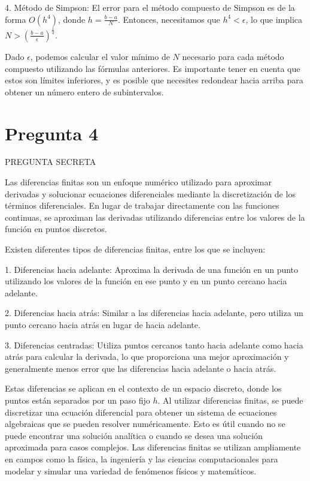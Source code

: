 \documentclass[a4paper,12pt]{article}
\begin{document}
4. Método de Simpson:
   El error para el método compuesto de Simpson es de la forma \( O(h^4) \), donde \( h = \frac{b - a}{N} \). Entonces, necesitamos que \( h^4 < \epsilon \), lo que implica \( N > \left(\frac{b - a}{\epsilon}\right)^{\frac{1}{4}} \).

Dado \( \epsilon \), podemos calcular el valor mínimo de \( N \) necesario para cada método compuesto utilizando las fórmulas anteriores. Es importante tener en cuenta que estos son límites inferiores, y es posible que necesites redondear hacia arriba para obtener un número entero de subintervalos.

\section*{Pregunta 4}
PREGUNTA SECRETA

Las diferencias finitas son un enfoque numérico utilizado para aproximar derivadas y solucionar ecuaciones diferenciales mediante la discretización de los términos diferenciales. En lugar de trabajar directamente con las funciones continuas, se aproximan las derivadas utilizando diferencias entre los valores de la función en puntos discretos.

Existen diferentes tipos de diferencias finitas, entre los que se incluyen:

1. Diferencias hacia adelante: Aproxima la derivada de una función en un punto utilizando los valores de la función en ese punto y en un punto cercano hacia adelante.
   
2. Diferencias hacia atrás: Similar a las diferencias hacia adelante, pero utiliza un punto cercano hacia atrás en lugar de hacia adelante.
   
3. Diferencias centradas: Utiliza puntos cercanos tanto hacia adelante como hacia atrás para calcular la derivada, lo que proporciona una mejor aproximación y generalmente menos error que las diferencias hacia adelante o hacia atrás.
   
Estas diferencias se aplican en el contexto de un espacio discreto, donde los puntos están separados por un paso fijo \( h \). Al utilizar diferencias finitas, se puede discretizar una ecuación diferencial para obtener un sistema de ecuaciones algebraicas que se pueden resolver numéricamente. Esto es útil cuando no se puede encontrar una solución analítica o cuando se desea una solución aproximada para casos complejos. Las diferencias finitas se utilizan ampliamente en campos como la física, la ingeniería y las ciencias computacionales para modelar y simular una variedad de fenómenos físicos y matemáticos.
\end{document}
